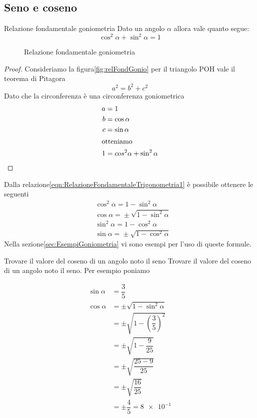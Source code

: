 \subsection{Seno e coseno}
\label{sec:RelazioniFondamentaliSenoCoseno}
\begin{teoremat}{Relazione fondamentale goniometria}{}
Dato un angolo $\alpha$ allora vale quanto segue:
\begin{equation*}
\cos^2\alpha+\sin^2\alpha=1\label{eqn:RelazioneFondamentaleTrigonometria1}
\end{equation*}
\end{teoremat}
\begin{figure}
	\centering
	
\caption{Relazione fondamentale goniometria}\label{fig:relFondGonio}
\end{figure}
\begin{proof}
	Consideriamo la figura\nobs\vref{fig:relFondGonio} per il triangolo POH vale il teorema di Pitagora \[a^2=b^2+c^2\] Dato che la circonferenza è una circonferenza goniometrica
	\begin{align*}
	a&=1\\
	b&=\cos\alpha\\
	c&=\sin\alpha\\
	\intertext{otteniamo}
	1&=cos^2\alpha+\sin^2\alpha\\
	\end{align*}
\end{proof}
Dalla relazione\nobs\vref{eqn:RelazioneFondamentaleTrigonometria1} è possibile ottenere le seguenti
\begin{align*}
&\cos^{2}\alpha={}1-\sin^{2}\alpha\\
&\cos\alpha={}\pm\sqrt{1-\sin^{2}\alpha}\\
&\sin^{2}\alpha={}1-\cos^{2}\alpha \\
&\sin\alpha={}\pm\sqrt{1-\cos^{2}\alpha}
\end{align*}
Nella sezione\nobs\vref{sec:EsempiGoniometria} vi sono esempi per l'uso di queste formule. 
\begin{esempiot}{Trovare il valore del coseno di un angolo noto il seno}{}
Trovare il valore del coseno di un angolo noto il seno. Per esempio poniamo 
\end{esempiot}
\begin{align*}
\sin\alpha&{}=\dfrac{3}{5}\\
\cos\alpha&=\pm\sqrt{1-\sin^2\alpha}\\
&=\pm\sqrt{1-\left(\dfrac{3}{5}\right)^2}\\
&=\pm\sqrt{1-\dfrac{9}{25}}\\
&=\pm\sqrt{\dfrac{25-9}{25}}\\
&=\pm\sqrt{\dfrac{16}{25}} \\
&=\pm\dfrac{4}{5}=\num{8e-1} 
\end{align*}
